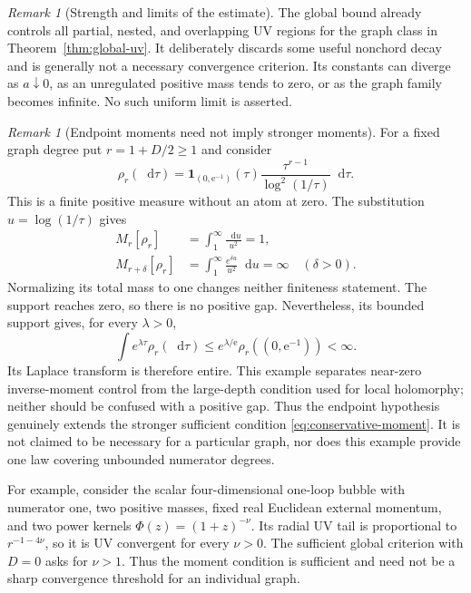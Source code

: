 \documentclass[final,5p,times,twocolumn,numbers,nopreprintline]{elsarticle}
\numberwithin{equation}{section}
\theoremstyle{definition}
\theoremstyle{remark}
\newtheorem{remark}[theorem]{Remark}
\newcommand{\dd}{\mathop{}\!\mathrm d}
\newcommand{\Ph}{\Phi}
\begin{document}
\begin{remark}[Strength and limits of the estimate]
The global bound already controls all partial, nested, and overlapping
UV regions for the graph class in Theorem~\ref{thm:global-uv}.
It deliberately discards some useful nonchord decay and is generally
not a necessary convergence criterion. Its constants can diverge as
\(a\downarrow0\), as an unregulated positive mass tends to zero, or
as the graph family becomes infinite. No such uniform limit is asserted.
\end{remark}

\begin{remark}[Endpoint moments need not imply stronger moments]
\label{rem:strict-endpoint-example}
For a fixed graph degree put \(r=1+D/2\geq1\) and consider
\begin{equation}
 \rho_r(\dd\tau)
 =\mathbf1_{(0,\mathrm e^{-1})}(\tau)
   \frac{\tau^{r-1}}{\log^2(1/\tau)}\dd\tau.
 \label{eq:endpoint-measure-example}
\end{equation}
This is a finite positive measure without an atom at zero. The
substitution \(u=\log(1/\tau)\) gives
\begin{equation}
 \begin{aligned}
  M_r[\rho_r]&=\int_1^\infty\frac{\dd u}{u^2}=1,\\
  M_{r+\delta}[\rho_r]
     &=\int_1^\infty\frac{e^{\delta u}}{u^2}\dd u=\infty
       \quad(\delta>0).
 \end{aligned}
 \label{eq:endpoint-measure-moments}
\end{equation}
Normalizing its total mass to one changes neither finiteness statement.
The support reaches zero, so there is no positive gap. Nevertheless,
its bounded support gives, for every \(\lambda>0\),
\[
 \int e^{\lambda\tau}\rho_r(\dd\tau)
       \leq e^{\lambda/\mathrm e}\rho_r((0,\mathrm e^{-1}))<\infty.
\]
Its Laplace transform is therefore entire. This example separates
near-zero inverse-moment control from the large-depth condition used
for local holomorphy; neither should be confused with a positive gap.
Thus the endpoint hypothesis genuinely extends the stronger sufficient
condition \eqref{eq:conservative-moment}. It is not claimed to be
necessary for a particular graph, nor does this example provide one
law covering unbounded numerator degrees.
\end{remark}

For example, consider the scalar four-dimensional one-loop bubble
with numerator one, two positive masses, fixed real Euclidean
external momentum, and two power kernels
\(\Ph(z)=(1+z)^{-\nu}\). Its radial UV tail is proportional to
\(r^{-1-4\nu}\), so it is UV convergent for every \(\nu>0\).
The sufficient global criterion with \(D=0\) asks for \(\nu>1\).
Thus the moment condition is sufficient and need not be a sharp
convergence threshold for an individual graph.
\end{document}
